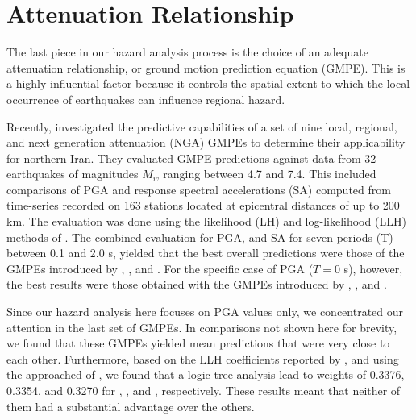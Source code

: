 
\section{Attenuation Relationship}

The last piece in our hazard analysis process is the choice of an adequate attenuation relationship, or ground motion prediction equation (GMPE). This is a highly influential factor because it controls the spatial extent to which the local occurrence of earthquakes can influence regional hazard. 

Recently, \citet{Zafarani2014} investigated the predictive capabilities of a set of nine local, regional, and next generation attenuation (NGA) GMPEs to determine their applicability for northern Iran. They evaluated GMPE predictions against data from 32 earthquakes of magnitudes $M_w$ ranging between 4.7 and 7.4. This included comparisons of PGA and response spectral accelerations (SA) computed from time-series recorded on 163 stations located at epicentral distances of up to 200 km. The evaluation was done using the likelihood (LH) and log-likelihood (LLH) methods of \citet{Scherbaum_2004_BSSA, Scherbaum_2009_BSSA}. The combined evaluation for PGA, and SA for seven periods (T) between 0.1 and 2.0 s, yielded that the best overall predictions were those of the GMPEs introduced by \citet{Ghasemi_2009_JS}, \citet{Abrahamson_2008_ES}, and \citet{Chiou2008}. For the specific case of PGA ($T=0$ s), however, the best results were those obtained with the GMPEs introduced by \citet{Kalkan2004}, \citet{Chiou2008}, and \citet{Boore2008}.

Since our hazard analysis here focuses on PGA values only, we concentrated our attention in the last set of GMPEs. In comparisons not shown here for brevity, we found that these GMPEs yielded mean predictions that were very close to each other. Furthermore, based on the LLH coefficients reported by \citet{Zafarani2014}, and using the approached of \citet{Scherbaum_2009_BSSA}, we found that a logic-tree analysis lead to weights of 0.3376, 0.3354, and 0.3270 for \citet{Kalkan2004}, \citet{Chiou2008}, and \citet{Boore2008}, respectively. These results meant that neither of them had a substantial advantage over the others. 

